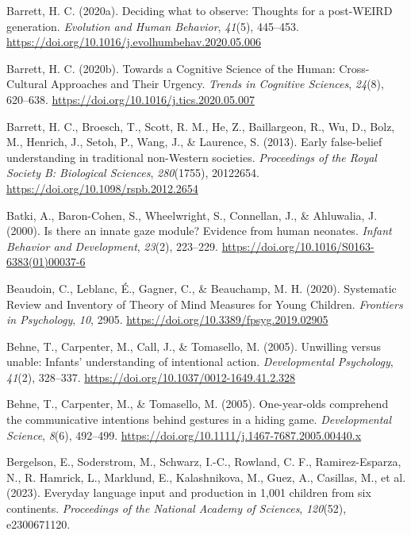 \documentclass[
]{scrbook}
\newlength{\cslhangindent}
\newenvironment{CSLReferences}[2] %
 {\begin{list}{}{%
  \setlength{\itemindent}{0pt}
  \setlength{\leftmargin}{0pt}
  \setlength{\parsep}{0pt}
  \ifodd #1
   \setlength{\leftmargin}{\cslhangindent}
   \setlength{\itemindent}{-1\cslhangindent}
  \fi
  \setlength{\itemsep}{#2\baselineskip}}}
 {\end{list}}
\begin{document}
\begin{CSLReferences}{1}{0}
Barrett, H. C. (2020a). Deciding what to observe: {Thoughts} for a post-{WEIRD} generation. \emph{Evolution and Human Behavior}, \emph{41}(5), 445--453. \url{https://doi.org/10.1016/j.evolhumbehav.2020.05.006}

Barrett, H. C. (2020b). Towards a {Cognitive Science} of the {Human}: {Cross-Cultural Approaches} and {Their Urgency}. \emph{Trends in Cognitive Sciences}, \emph{24}(8), 620--638. \url{https://doi.org/10.1016/j.tics.2020.05.007}

Barrett, H. C., Broesch, T., Scott, R. M., He, Z., Baillargeon, R., Wu, D., Bolz, M., Henrich, J., Setoh, P., Wang, J., \& Laurence, S. (2013). Early false-belief understanding in traditional non-{Western} societies. \emph{Proceedings of the Royal Society B: Biological Sciences}, \emph{280}(1755), 20122654. \url{https://doi.org/10.1098/rspb.2012.2654}

Batki, A., Baron-Cohen, S., Wheelwright, S., Connellan, J., \& Ahluwalia, J. (2000). Is there an innate gaze module? {Evidence} from human neonates. \emph{Infant Behavior and Development}, \emph{23}(2), 223--229. \url{https://doi.org/10.1016/S0163-6383(01)00037-6}

Beaudoin, C., Leblanc, É., Gagner, C., \& Beauchamp, M. H. (2020). Systematic {Review} and {Inventory} of {Theory} of {Mind Measures} for {Young Children}. \emph{Frontiers in Psychology}, \emph{10}, 2905. \url{https://doi.org/10.3389/fpsyg.2019.02905}

Behne, T., Carpenter, M., Call, J., \& Tomasello, M. (2005). Unwilling versus unable: Infants' understanding of intentional action. \emph{Developmental Psychology}, \emph{41}(2), 328--337. \url{https://doi.org/10.1037/0012-1649.41.2.328}

Behne, T., Carpenter, M., \& Tomasello, M. (2005). One-year-olds comprehend the communicative intentions behind gestures in a hiding game. \emph{Developmental Science}, \emph{8}(6), 492--499. \url{https://doi.org/10.1111/j.1467-7687.2005.00440.x}

Bergelson, E., Soderstrom, M., Schwarz, I.-C., Rowland, C. F., Ramirez-Esparza, N., R. Hamrick, L., Marklund, E., Kalashnikova, M., Guez, A., Casillas, M., et al. (2023). Everyday language input and production in 1,001 children from six continents. \emph{Proceedings of the National Academy of Sciences}, \emph{120}(52), e2300671120.


\end{CSLReferences}
\end{document}
